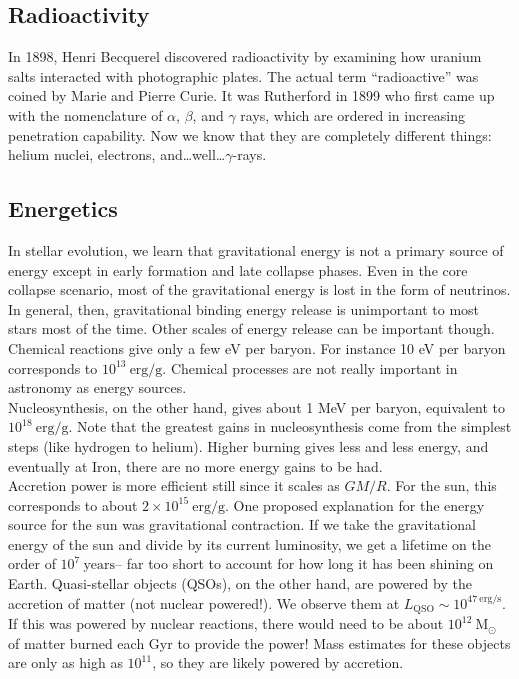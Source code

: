 \documentclass[10pt]{article}
\numberwithin{equation}{section}
\newcommand{\n}{\noindent}
\begin{document}
	\subsection{Radioactivity} %
	\label{sub:radioactivity}
		In 1898, Henri Becquerel discovered radioactivity by examining how uranium salts interacted with photographic plates. The actual term ``radioactive'' was coined by Marie and Pierre Curie. It was Rutherford in 1899 who first came up with the nomenclature of $\alpha$, $\beta$, and $\gamma$ rays, which are ordered in increasing penetration capability. Now we know that they are completely different things: helium nuclei, electrons, and\ldots well\ldots $\gamma$-rays.
	
	\subsection{Energetics} %
	\label{sub:energetics}
		In stellar evolution, we learn that gravitational energy is not a primary source of energy except in early formation and late collapse phases. Even in the core collapse scenario, most of the gravitational energy is lost in the form of neutrinos. In general, then, gravitational binding energy release is unimportant to most stars most of the time. Other scales of energy release can be important though.\\
		
		\n Chemical reactions give only a few eV per baryon. For instance 10 eV per baryon corresponds to $10^{13}\ \mathrm{erg/g}$. Chemical processes are not really important in astronomy as energy sources.\\
		
		\n Nucleosynthesis, on the other hand, gives about 1 MeV per baryon, equivalent to $10^{18}\ \mathrm{erg/g}$. Note that the greatest gains in nucleosynthesis come from the simplest steps (like hydrogen to helium). Higher burning gives less and less energy, and eventually at Iron, there are no more energy gains to be had. \\
		
		\n Accretion power is more efficient still since it scales as $GM/R$. For the sun, this corresponds to about $2\times 10^{15}\ \mathrm{erg/g}$. One proposed explanation for the energy source for the sun was gravitational contraction. If we take the gravitational energy of the sun and divide by its current luminosity, we get a lifetime on the order of $10^{7}\ \mathrm{years}$-- far too short to account for how long it has been shining on Earth. Quasi-stellar objects (QSOs), on the other hand, are powered by the accretion of matter (not nuclear powered!). We observe them at $L_{\mathrm{QSO}}\sim 10^{47\ \mathrm{erg/s}}$. If this was powered by nuclear reactions, there would need to be about $10^{12}\ \mathrm{M_\odot}$ of matter burned each Gyr to provide the power! Mass estimates for these objects are only as high as $10^{11}$, so they are likely powered by accretion.
\end{document}
